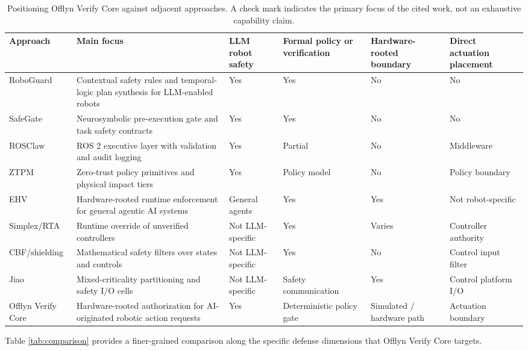 \documentclass[10pt]{article}
\newcommand{\ovc}{Offlyn Verify Core\xspace}
\begin{document}
\begin{table}[t]
\centering
\small
\caption{Positioning \ovc against adjacent approaches. A check mark indicates the primary focus of the cited work, not an exhaustive capability claim.}
\label{tab:related}
\begin{tabularx}{\textwidth}{>{\raggedright\arraybackslash}p{2.7cm}X>{\centering\arraybackslash}p{1.45cm}>{\centering\arraybackslash}p{1.45cm}>{\centering\arraybackslash}p{1.55cm}>{\centering\arraybackslash}p{1.55cm}}
\toprule
Approach & Main focus & LLM robot safety & Formal policy or verification & Hardware-rooted boundary & Direct actuation placement \\
\midrule
RoboGuard \cite{roboguard2025} & Contextual safety rules and temporal-logic plan synthesis for LLM-enabled robots & Yes & Yes & No & No \\
SafeGate \cite{safegate2026} & Neurosymbolic pre-execution gate and task safety contracts & Yes & Yes & No & No \\
ROSClaw \cite{rosclaw2026} & ROS 2 executive layer with validation and audit logging & Yes & Partial & No & Middleware \\
ZTPM \cite{ztpm2026} & Zero-trust policy primitives and physical impact tiers & Yes & Policy model & No & Policy boundary \\
EHV \cite{ehv2026} & Hardware-rooted runtime enforcement for general agentic AI systems & General agents & Yes & Yes & Not robot-specific \\
Simplex/RTA \cite{simplex2021,nasa2024rta} & Runtime override of unverified controllers & Not LLM-specific & Yes & Varies & Controller authority \\
CBF/shielding \cite{ames2019cbf,shields2022} & Mathematical safety filters over states and controls & Not LLM-specific & Yes & No & Control input filter \\
Jiao \cite{jiao2026} & Mixed-criticality partitioning and safety I/O cells & Not LLM-specific & Safety communication & Yes & Control platform I/O \\
\ovc & Hardware-rooted authorization for AI-originated robotic action requests & Yes & Deterministic policy gate & Simulated / hardware path & Actuation boundary \\
\bottomrule
\end{tabularx}
\end{table}

Table \ref{tab:comparison} provides a finer-grained comparison along the specific defense dimensions that \ovc targets.
\end{document}
